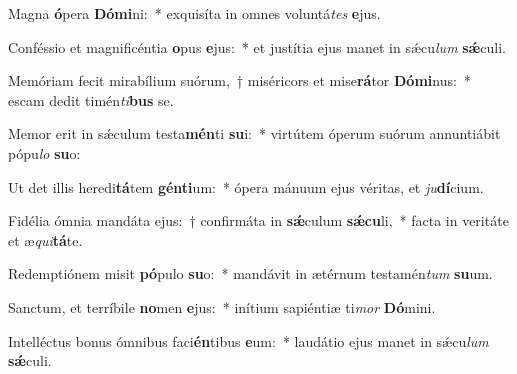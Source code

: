 \item Magna \textbf{ó}pera \textbf{Dó}\textbf{mi}ni:~* exquisíta in omnes voluntá\textit{tes} \textbf{e}jus.
\item Conféssio et magnificéntia \textbf{o}pus \textbf{e}jus:~* et justítia ejus manet in sǽcu\textit{lum} \textbf{sǽ}culi.
\item Memóriam fecit mirabílium suórum,~† miséricors et mise\textbf{rá}tor \textbf{Dó}\textbf{mi}nus:~* escam dedit timén\textit{ti}\textbf{bus} se.
\item Memor erit in sǽculum testa\textbf{mén}ti \textbf{su}i:~* virtútem óperum suórum annuntiábit pópu\textit{lo} \textbf{su}o:
\item Ut det illis heredi\textbf{tá}tem \textbf{gén}\textbf{ti}um:~* ópera mánuum ejus véritas, et \textit{ju}\textbf{dí}cium.
\item Fidélia ómnia mandáta ejus:~† confirmáta in \textbf{sǽ}culum \textbf{sǽ}\textbf{cu}li,~* facta in veritáte et æ\textit{qui}\textbf{tá}te.
\item Redemptiónem misit \textbf{pó}pulo \textbf{su}o:~* mandávit in ætérnum testamén\textit{tum} \textbf{su}um.
\item Sanctum, et terríbile \textbf{no}men \textbf{e}jus:~* inítium sapiéntiæ ti\textit{mor} \textbf{Dó}mini.
\item Intelléctus bonus ómnibus faci\textbf{én}tibus \textbf{e}um:~* laudátio ejus manet in sǽcu\textit{lum} \textbf{sǽ}culi.
